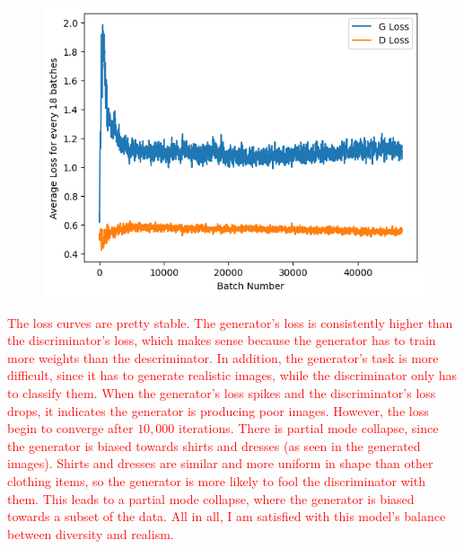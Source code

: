 \documentclass{genai}
\begin{document}
\begin{enumerate}
	\begin{figure}[t]
		\includegraphics[width=.7\linewidth]{loss_chart.png}
	\end{figure}

	\textcolor{red}{The loss curves are pretty stable. The generator's loss is consistently higher than the discriminator's loss, which makes sense because the generator has to train more weights than the descriminator.
		In addition, the generator's task is more difficult, since it has to generate realistic images, while the discriminator only has to classify them. 
		When the generator's loss spikes and the discriminator's loss drops, it indicates the generator is producing poor images.
		However, the loss begin to converge after $10,000$ iterations. There is partial mode collapse, since the generator is biased towards shirts and dresses (as seen in the generated images).
		Shirts and dresses are similar and more uniform in shape than other clothing items, so the generator is more likely to fool the discriminator with them.
		This leads to a partial mode collapse, where the generator is biased towards a subset of the data.
		All in all, I am satisfied with this model's balance between diversity and realism.
	}

\end{enumerate}
\end{document}
